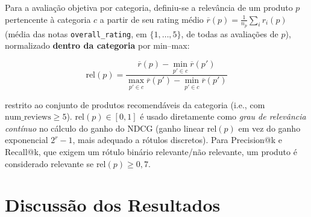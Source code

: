 \documentclass{IEEEtran}
\begin{document}
Para a avaliação objetiva por categoria, definiu-se a relevância de um produto $p$
pertencente à categoria $c$ a partir de seu rating médio
$\overline{r}(p) = \frac{1}{n_p}\sum_i r_i(p)$ (média das notas
\texttt{overall\_rating}, em $\{1,\ldots,5\}$, de todas as avaliações de $p$),
normalizado \textbf{dentro da categoria} por min--max:

\begin{equation}
  \text{rel}(p) = \frac{\overline{r}(p) - \min_{p' \in c}\overline{r}(p')}
                       {\max_{p' \in c}\overline{r}(p') - \min_{p' \in c}\overline{r}(p')}
  \label{eq:relevancia_rating}
\end{equation}

restrito ao conjunto de produtos recomendáveis da categoria (i.e., com
$\text{num\_reviews} \geq 5$). $\text{rel}(p) \in [0, 1]$ é usado diretamente como
\textit{grau de relevância contínuo} no cálculo do ganho do NDCG (ganho linear
$\text{rel}(p)$ em vez do ganho exponencial $2^{r}-1$, mais adequado a rótulos
discretos). Para Precision@k e Recall@k, que exigem um rótulo binário
relevante/não relevante, um produto é considerado relevante se
$\text{rel}(p) \geq 0{,}7$.



\section{Discussão dos Resultados}
\label{sec:discussion}
\end{document}
